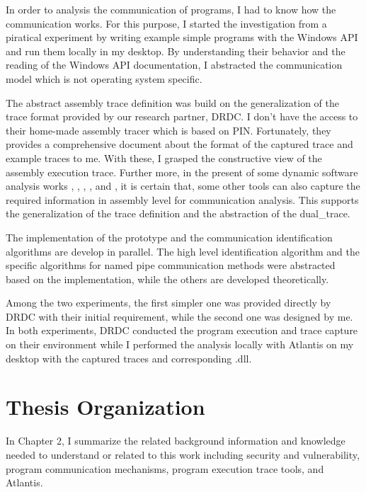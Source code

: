 In order to analysis the communication of programs, I had to know how the communication works. For this purpose, I started the investigation from a piratical experiment by writing example simple programs with the Windows API and run them locally in my desktop. By understanding their behavior and the reading of the Windows API documentation, I abstracted the communication model which is not operating system specific.

The abstract assembly trace definition was build on the generalization of the trace format provided by our research partner, DRDC. I don't have the access to their home-made assembly tracer which is based on PIN\cite{_pin_????}. Fortunately, they provides a comprehensive document about the format of the captured trace and example traces to me. With these, I grasped the constructive view of the assembly execution trace. Further more, in the present of some dynamic software analysis works \cite{godefroid2008automated}, \cite{li2013software}, \cite{sailer2016coretana}, \cite{balakrishnan2004analyzing}, \cite{bhansali2006framework} and \cite{trumper2012maintenance}, it is certain that, some other tools can also capture the required information in assembly level for communication analysis. This supports the generalization of the trace definition and the abstraction of the dual\_trace.

The implementation of the prototype and the communication identification algorithms are develop in parallel. The high level identification algorithm and the specific algorithms for named pipe communication methods were abstracted based on the implementation, while the others are developed theoretically.

Among the two experiments, the first simpler one was provided directly by DRDC with their initial requirement, while the second one was designed by me. In both experiments, DRDC conducted the program execution and trace capture on their environment while I performed the analysis locally with Atlantis on my desktop with the captured traces and corresponding .dll.


\section{Thesis Organization}
In Chapter 2, I summarize the related background information and knowledge needed to understand or related to this work including security and vulnerability, program communication mechanisms, program execution trace tools, and Atlantis. 

